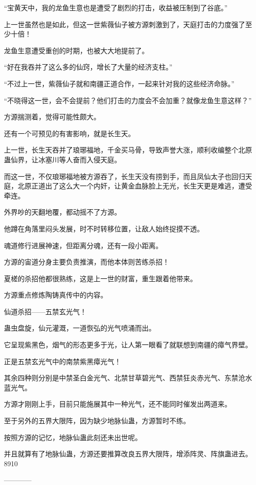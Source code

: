 \begin{this_body}
“宝黄天中，我的龙鱼生意也是遭受了剧烈的打击，收益被压制到了谷底。”

上一世虽然也是如此，但这一世紫薇仙子被方源刺激到了，天庭打击的力度强了至少十倍！

龙鱼生意遭受重创的时期，也被大大地提前了。

“好在我吞并了这么多的仙窍，增长了大量的经济支柱。”

“不过上一世，紫薇仙子就和南疆正道合作，一起来针对我的这些经济命脉。”

“不晓得这一世，会不会提前？他们打击的力度会不会加重？就像龙鱼生意这样？”

方源揣测着，觉得可能性颇大。

还有一个可预见的有害影响，就是长生天。

上一世，长生天吞并了琅琊福地，千金买马骨，导致声誉大涨，顺利收编整个北原蛊仙界，让冰塞川等人奋而入侵天庭。

而这一世，不仅琅琊福地被方源吞了，长生天没有捞到手，而且凤仙太子也回归天庭，北原正道出了这么大一个内奸，让黄金血脉脸上无光，长生天更是难逃，遭受牵连。

外界吵的天翻地覆，都动摇不了方源。

他蹲在角落里闷头发展，时不时转移位置，让敌人始终捉摸不透。

魂道修行进展神速，但距离分魂，还有一段小距离。

方源的宙道分身主要负责推演，而他本体则苦练杀招！

夏槎的杀招他都很熟练，这是上一世的财富，重生跟着他带来。

方源重点修炼陶铸真传中的内容。

仙道杀招——五禁玄光气！

蛊虫盘旋，仙元灌溉，一道恢弘的光气喷涌而出。

它呈现紫黑色，烟气的形态更多于光，让人第一眼看了就联想到南疆的瘴气界壁。

正是五禁玄光气中的南禁紫黑瘴光气！

其余四种则分别是中禁圣白金光气、北禁甘草碧光气、西禁狂炎赤光气、东禁沧水蓝光气。

方源才刚刚上手，目前只能施展其中一种光气，还不能同时催发出两道来。

至于另外的五界大限阵，因为缺少地脉仙蛊，方源暂时不练。

按照方源的记忆，地脉仙蛊此刻还未出世呢。

并且就算有了地脉仙蛊，方源还要推算改良五界大限阵，增添阵灵、阵旗蛊进去。8910

------------

\end{this_body}

